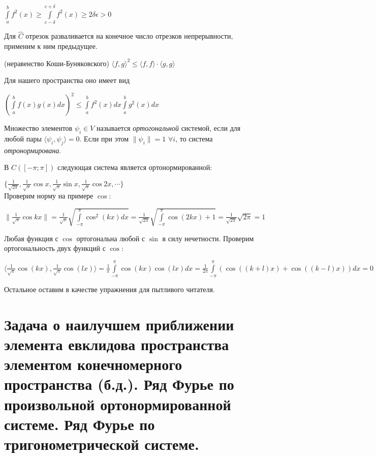 \documentclass{article}
\begin{document}
	$\int\limits_a^b f^2(x) \ge \int\limits_{c-\delta}^{c+\delta} f^2(x) \ge 2\delta\epsilon > 0$
	
	Для $\hat C$ отрезок разваливается на конечное число отрезков непрерывности, применим к ним предыдущее.
	
	\begin{theorem} (неравенство Коши-Буняковского) $\langle f, g \rangle^2 \le \langle f, f \rangle \cdot \langle g, g \rangle$ \end{theorem}
	
	Для нашего пространства оно имеет вид 
	
	$(\int\limits_a^b f(x)g(x)dx)^2 \le \int\limits_a^b f^2(x)dx \int\limits_a^b g^2(x)dx$
	
	\begin{definition}
		Множество элементов  ${\psi_i} \in V$ называется \textit{ортогональной} системой, если для любой пары $\langle \psi_i, \psi_j\rangle=0$. Если при этом $\| \psi_i \|=1$ $\forall i$, то система \textit{отронормирована}.
	\end{definition}

	В $C([-\pi; \pi])$ следующая система является ортонормированной:
	
	$\{{\frac{1}{\sqrt{2\pi}}, \frac{1}{\sqrt{\pi}}\cos x, \frac{1}{\sqrt{\pi}}\sin x, \frac{1}{\sqrt{\pi}}\cos {2x}, \cdots}\}$\\
	
	Проверим норму на примере $\cos$:
	
	$\| \frac{1}{\sqrt{\pi}}\cos {kx}\|= \frac{1}{\sqrt{\pi}}
	 \sqrt{\int\limits_{-\pi}^{\pi} \cos^2 (kx) dx}=
	 \frac{1}{\sqrt{2\pi}} \sqrt{\int\limits_{-\pi}^{\pi} \cos(2kx) + 1}=\frac{1}{\sqrt{2\pi}} \sqrt{2\pi}=1$
	
	Любая функция с $\cos$ ортогональна любой с $\sin$ в силу нечетности. Проверим ортогональность двух функций с $\cos$:
	
	$\langle \frac{1}{\sqrt{\pi}} \cos(kx), \frac{1}{\sqrt{\pi}}\cos(lx) \rangle=\frac{1}{\pi}\int\limits_{-\pi}^{\pi}\cos(kx) \cos(lx) dx=\frac{1}{2\pi}\int\limits_{-\pi}^{\pi}(\cos((k+l)x)+\cos((k-l)x)) dx=0$
	
	Остальное оставим в качестве упражнения для пытливого читателя.
	
	\section{Задача о наилучшем приближении элемента евклидова пространства элементом конечномерного пространства (б.д.). Ряд Фурье по произвольной ортонормированной системе. Ряд Фурье по тригонометрической системе.}
	
\end{document}
